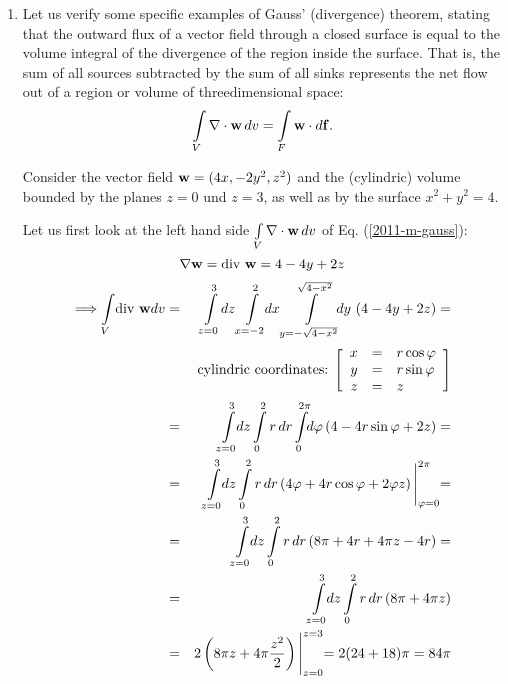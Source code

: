 {\begin{enumerate}
\item
Let us verify  some specific examples of Gauss' (divergence) theorem,
stating that the outward flux of a vector field through a closed surface
is equal to the volume integral of the divergence of the region inside the surface.
That is, the sum of all sources subtracted by the sum of all sinks represents the net flow out of a region or volume of threedimensional space:
\begin{equation}
\int \limits_V \nabla \cdot {\bf w} \, dv   =\int \limits_F {\bf w} \cdot d{\bf f}
.   \label{2011-m-gauss}
\end{equation}

Consider the vector field ${\bf w} = (4x, -2y^2, z^2)$
and the (cylindric) volume bounded by the planes  $z=0$ und $z=3$,
as well as by the surface
$x^2 + y^2 = 4$.


Let us first look at the left hand side $\int \limits_V \nabla \cdot {\bf w} \, dv $
of Eq. (\ref{2011-m-gauss}):
$$
  \nabla {\bf w}=\textrm{div } {\bf w}=4-4y+2z
$$
\begin{eqnarray*}
  \Longrightarrow \int \limits_V \! \textrm{div } {\bf w} dv& = &
  \int \limits_{z=0}^3 \! dz \int \limits_{x=-2}^2 \!\! dx
  \int \limits_{y=-\sqrt{4-x^2}}^{\sqrt{4-x^2}} \!\!\!dy\,
    \left(4-4y+2z\right)= \\
  & & \mbox{cylindric coordinates: }
  \Biggl[
    \begin{array}{rcl}
      x & = & r \cos \varphi \\
      y & = & r \sin \varphi \\
      z & = & z
    \end{array}
  \Biggr] \\
  & = & \int \limits_{z=0}^3 \!\! dz \int \limits_0^2 r\, dr
  \int \limits_0^{2\pi} \!\! d\varphi \left(4-4r \sin \varphi+2z\right)= \\
  & = & \int \limits_{z=0}^3 \!\! dz \int \limits_0^2 r \, dr
  \left(4 \varphi +4r\cos\varphi+2\varphi z\right)
  \Biggl|_{\varphi=0}^{2 \pi}= \\
  & = & \int \limits_{z=0}^3 \!\! dz \int \limits_0^2 r\, dr
  \left(8 \pi +4r+4 \pi z -4r\right)= \\
  & = & \int \limits_{z=0}^3 \!\! dz \int \limits_0^2 r\, dr
  \left(8 \pi +4 \pi z\right) \\
  & = & 2 \left( 8 \pi z +4 \pi \frac{z^2}{2}\right)\Biggl|_{z=0}^{z=3}=
    2 (24+18) \pi = 84 \pi
\end{eqnarray*}


\end{enumerate}}
